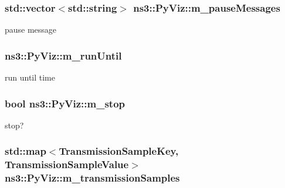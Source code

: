\subsubsection[{\texorpdfstring{m\+\_\+pause\+Messages}{m_pauseMessages}}]{\setlength{\rightskip}{0pt plus 5cm}std\+::vector$<$std\+::string$>$ ns3\+::\+Py\+Viz\+::m\+\_\+pause\+Messages\hspace{0.3cm}{\ttfamily [private]}}\hypertarget{classns3_1_1PyViz_a9a1b3409dabe3cfd0a42b5e361971656}{}\label{classns3_1_1PyViz_a9a1b3409dabe3cfd0a42b5e361971656}


pause message 

\subsubsection[{\texorpdfstring{m\+\_\+run\+Until}{m_runUntil}}]{ ns3\+::\+Py\+Viz\+::m\+\_\+run\+Until\hspace{0.3cm}{\ttfamily [private]}}\hypertarget{classns3_1_1PyViz_af621e6600771eb6a0dec8fcbc6c1e032}{}\label{classns3_1_1PyViz_af621e6600771eb6a0dec8fcbc6c1e032}
run until time 
\subsubsection[{\texorpdfstring{m\+\_\+stop}{m_stop}}]{\setlength{\rightskip}{0pt plus 5cm}bool ns3\+::\+Py\+Viz\+::m\+\_\+stop\hspace{0.3cm}{\ttfamily [private]}}\hypertarget{classns3_1_1PyViz_a56fd9349277473f755630786931accc8}{}\label{classns3_1_1PyViz_a56fd9349277473f755630786931accc8}


stop? 

\subsubsection[{\texorpdfstring{m\+\_\+transmission\+Samples}{m_transmissionSamples}}]{\setlength{\rightskip}{0pt plus 5cm}std\+::map$<${\bf Transmission\+Sample\+Key}, {\bf Transmission\+Sample\+Value}$>$ ns3\+::\+Py\+Viz\+::m\+\_\+transmission\+Samples\hspace{0.3cm}{\ttfamily [private]}}\hypertarget{classns3_1_1PyViz_ab5e919d5d58fc6088fc94f5792a34225}{}\label{classns3_1_1PyViz_ab5e919d5d58fc6088fc94f5792a34225}


